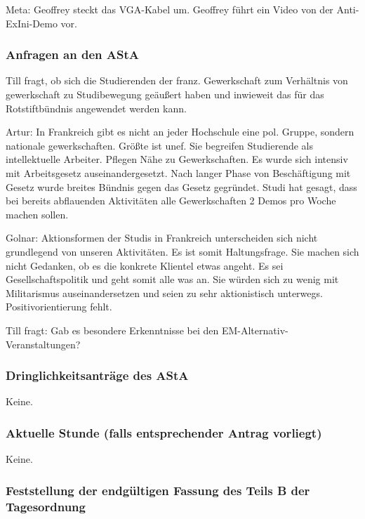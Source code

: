 \documentclass[ngerman,headheight=70pt]{scrartcl}
\begin{document}
    Meta: Geoffrey steckt das VGA-Kabel um. Geoffrey führt ein Video von der
    Anti-ExIni-Demo vor.

    \subsubsection{Anfragen an den AStA}

    Till fragt, ob sich die Studierenden der franz. Gewerkschaft zum Verhältnis
    von gewerkschaft zu Studibewegung geäußert haben und inwieweit das für das
    Rotstiftbündnis angewendet werden kann.

    Artur: In Frankreich gibt es nicht an jeder Hochschule eine pol. Gruppe, sondern
    nationale gewerkschaften. Größte ist unef. Sie begreifen Studierende als
    intellektuelle Arbeiter. Pflegen Nähe zu Gewerkschaften. Es wurde sich
    intensiv mit Arbeitsgesetz auseinandergesetzt. Nach langer Phase von Beschäftigung
    mit Gesetz wurde breites Bündnis gegen das Gesetz gegründet. Studi hat gesagt,
    dass bei bereits abflauenden Aktivitäten alle Gewerkschaften 2 Demos pro
    Woche machen sollen.

    Golnar: Aktionsformen der Studis in Frankreich unterscheiden sich nicht
    grundlegend von unseren Aktivitäten. Es ist somit Haltungsfrage. Sie machen
    sich nicht Gedanken, ob es die konkrete Klientel etwas angeht. Es sei
    Gesellschaftspolitik und geht somit alle was an. Sie würden sich zu wenig
    mit Militarismus auseinandersetzen und seien zu sehr aktionistisch unterwegs.
    Positivorientierung fehlt.

    Till fragt: Gab es besondere Erkenntnisse bei den EM-Alternativ-Veranstaltungen?

    \subsubsection{Dringlichkeitsanträge des AStA}

    Keine.

    \subsubsection{Aktuelle Stunde (falls entsprechender Antrag vorliegt)}

    Keine.

    \subsubsection{Feststellung der endgültigen Fassung des Teils B der Tagesordnung}
\end{document}
